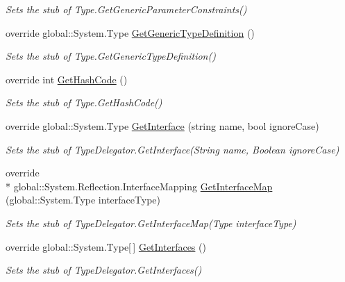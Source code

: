 \begin{DoxyCompactItemize}
\begin{DoxyCompactList}\small\item\em Sets the stub of Type.\-Get\-Generic\-Parameter\-Constraints()\end{DoxyCompactList}\item 
override global\-::\-System.\-Type \hyperlink{class_system_1_1_reflection_1_1_fakes_1_1_stub_type_delegator_a66c1663519c7132a239194cfe2268c5a}{Get\-Generic\-Type\-Definition} ()
\begin{DoxyCompactList}\small\item\em Sets the stub of Type.\-Get\-Generic\-Type\-Definition()\end{DoxyCompactList}\item 
override int \hyperlink{class_system_1_1_reflection_1_1_fakes_1_1_stub_type_delegator_a613c2db5245f885b2b1272e1b9a255ee}{Get\-Hash\-Code} ()
\begin{DoxyCompactList}\small\item\em Sets the stub of Type.\-Get\-Hash\-Code()\end{DoxyCompactList}\item 
override global\-::\-System.\-Type \hyperlink{class_system_1_1_reflection_1_1_fakes_1_1_stub_type_delegator_a2e1e1f8271fda885a46a2dab27f00ce3}{Get\-Interface} (string name, bool ignore\-Case)
\begin{DoxyCompactList}\small\item\em Sets the stub of Type\-Delegator.\-Get\-Interface(\-String name, Boolean ignore\-Case)\end{DoxyCompactList}\item 
override \\*
global\-::\-System.\-Reflection.\-Interface\-Mapping \hyperlink{class_system_1_1_reflection_1_1_fakes_1_1_stub_type_delegator_ac14363042b153656fe817ea62a888e97}{Get\-Interface\-Map} (global\-::\-System.\-Type interface\-Type)
\begin{DoxyCompactList}\small\item\em Sets the stub of Type\-Delegator.\-Get\-Interface\-Map(\-Type interface\-Type)\end{DoxyCompactList}\item 
override global\-::\-System.\-Type\mbox{[}$\,$\mbox{]} \hyperlink{class_system_1_1_reflection_1_1_fakes_1_1_stub_type_delegator_a780b3749a5da967b1343ef616a741439}{Get\-Interfaces} ()
\begin{DoxyCompactList}\small\item\em Sets the stub of Type\-Delegator.\-Get\-Interfaces()\end{DoxyCompactList}\item 

\end{DoxyCompactItemize}
